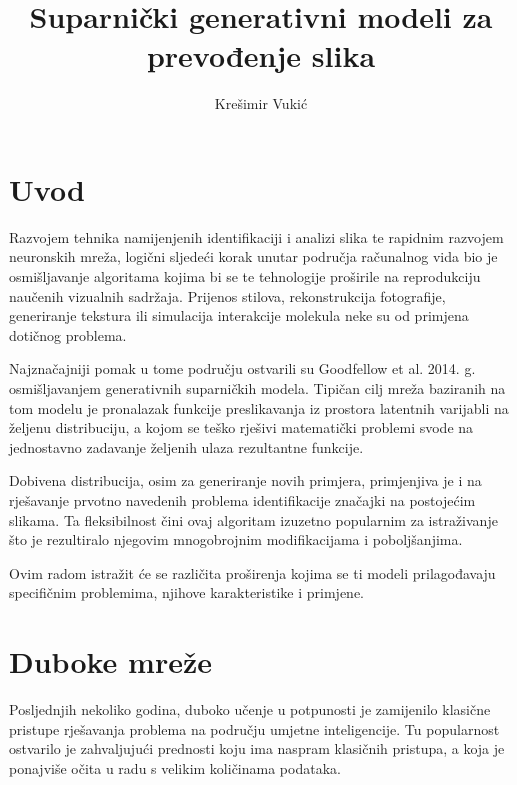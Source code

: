 \documentclass[lmodern, utf8, seminar]{fer}
\begin{document}
\nocite{*}



\title{Suparnički generativni modeli za prevođenje slika}

\author{Krešimir Vukić}

\maketitle


\tableofcontents



\chapter{Uvod}
Razvojem tehnika namijenjenih identifikaciji i analizi slika te rapidnim razvojem neuronskih mreža, logični sljedeći korak unutar područja računalnog vida bio je osmišljavanje algoritama kojima bi se te tehnologije proširile na reprodukciju naučenih vizualnih sadržaja. 
Prijenos stilova, rekonstrukcija fotografije, generiranje tekstura ili simulacija interakcije molekula neke su od primjena dotičnog problema.
\newline

Najznačajniji pomak u tome području ostvarili su Goodfellow et al. 2014. g. \cite{goodfellow2014generative} osmišljavanjem generativnih suparničkih modela. Tipičan cilj mreža baziranih na tom modelu je pronalazak funkcije preslikavanja iz prostora latentnih varijabli na željenu distribuciju, a kojom se teško rješivi matematički problemi svode na jednostavno zadavanje željenih ulaza rezultantne funkcije.
\newline

Dobivena distribucija, osim za generiranje novih primjera, primjenjiva je i na rješavanje prvotno navedenih problema identifikacije značajki na postojećim slikama. Ta fleksibilnost čini ovaj algoritam izuzetno popularnim za istraživanje što je rezultiralo njegovim mnogobrojnim modifikacijama i poboljšanjima.
\newline

Ovim radom istražit će se različita proširenja kojima se ti modeli prilagođavaju specifičnim problemima, njihove karakteristike i primjene.

\chapter{Duboke mreže}
Posljednjih nekoliko godina, duboko učenje u potpunosti je zamijenilo klasične pristupe rješavanja problema na području umjetne inteligencije. Tu popularnost ostvarilo je zahvaljujući prednosti koju ima naspram klasičnih pristupa, a koja je ponajviše očita u radu s velikim količinama podataka. 
\end{document}
